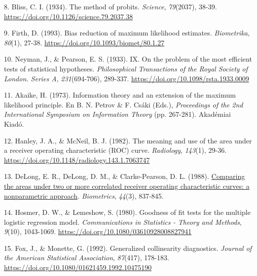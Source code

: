 \documentclass[
  spanish,
  10pt,
]{article}
\newlength{\cslhangindent}
\newenvironment{CSLReferences}[2] %
 {\begin{list}{}{%
  \setlength{\itemindent}{0pt}
  \setlength{\leftmargin}{0pt}
  \setlength{\parsep}{0pt}
  \ifodd #1
   \setlength{\leftmargin}{\cslhangindent}
   \setlength{\itemindent}{-1\cslhangindent}
  \fi
  \setlength{\itemsep}{#2\baselineskip}}}
 {\end{list}}
\begin{document}
\begin{CSLReferences}{1}{0}
8. Bliss, C. I. (1934). The method of probits. \emph{Science},
\emph{79}(2037), 38-39. \url{https://doi.org/10.1126/science.79.2037.38}

9. Firth, D. (1993). Bias reduction of maximum likelihood estimates.
\emph{Biometrika}, \emph{80}(1), 27-38.
\url{https://doi.org/10.1093/biomet/80.1.27}

10. Neyman, J., \& Pearson, E. S. (1933). {IX}. {On} the problem of the
most efficient tests of statistical hypotheses. \emph{Philosophical
Transactions of the Royal Society of London. Series A},
\emph{231}(694-706), 289-337.
\url{https://doi.org/10.1098/rsta.1933.0009}

11. Akaike, H. (1973). Information theory and an extension of the
maximum likelihood principle. En B. N. Petrov \& F. Csáki (Eds.),
\emph{Proceedings of the 2nd International Symposium on Information
Theory} (pp. 267-281). Akad{é}miai Kiad{ó}.

12. Hanley, J. A., \& McNeil, B. J. (1982). The meaning and use of the
area under a receiver operating characteristic ({ROC}) curve.
\emph{Radiology}, \emph{143}(1), 29-36.
\url{https://doi.org/10.1148/radiology.143.1.7063747}

13. DeLong, E. R., DeLong, D. M., \& Clarke-Pearson, D. L. (1988).
\href{https://www.ncbi.nlm.nih.gov/pubmed/3203132}{Comparing the areas
under two or more correlated receiver operating characteristic curves: a
nonparametric approach}. \emph{Biometrics}, \emph{44}(3), 837-845.

14. Hosmer, D. W., \& Lemeshow, S. (1980). Goodness of fit tests for the
multiple logistic regression model. \emph{Communications in Statistics -
Theory and Methods}, \emph{9}(10), 1043-1069.
\url{https://doi.org/10.1080/03610928008827941}

15. Fox, J., \& Monette, G. (1992). Generalized collinearity
diagnostics. \emph{Journal of the American Statistical Association},
\emph{87}(417), 178-183.
\url{https://doi.org/10.1080/01621459.1992.10475190}

\end{CSLReferences}
\end{document}
